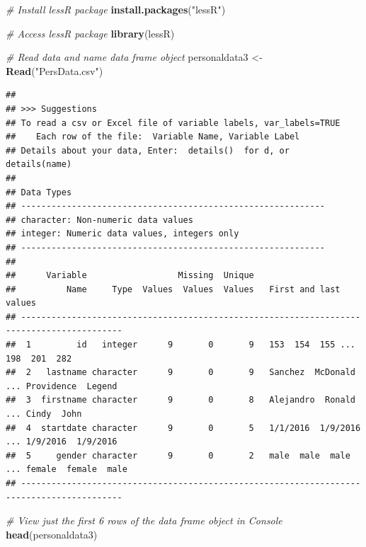 \documentclass[]{book}
\newenvironment{Shaded}{\begin{snugshade}}{\end{snugshade}}
\newcommand{\KeywordTok}[1]{\textcolor[rgb]{0.13,0.29,0.53}{\textbf{#1}}}
\newcommand{\StringTok}[1]{\textcolor[rgb]{0.31,0.60,0.02}{#1}}
\newcommand{\CommentTok}[1]{\textcolor[rgb]{0.56,0.35,0.01}{\textit{#1}}}
\newcommand{\NormalTok}[1]{#1}
\begin{document}
\begin{Shaded}
\begin{Highlighting}[]
\CommentTok{# Install lessR package}
\KeywordTok{install.packages}\NormalTok{(}\StringTok{"lessR"}\NormalTok{)}
\end{Highlighting}
\end{Shaded}

\begin{Shaded}
\begin{Highlighting}[]
\CommentTok{# Access lessR package}
\KeywordTok{library}\NormalTok{(lessR)}

\CommentTok{# Read data and name data frame object}
\NormalTok{personaldata3 <-}\StringTok{ }\KeywordTok{Read}\NormalTok{(}\StringTok{"PersData.csv"}\NormalTok{)}
\end{Highlighting}
\end{Shaded}

\begin{verbatim}
## 
## >>> Suggestions
## To read a csv or Excel file of variable labels, var_labels=TRUE
##    Each row of the file:  Variable Name, Variable Label
## Details about your data, Enter:  details()  for d, or  details(name)
## 
## Data Types
## ------------------------------------------------------------
## character: Non-numeric data values
## integer: Numeric data values, integers only
## ------------------------------------------------------------
## 
##      Variable                  Missing  Unique 
##          Name     Type  Values  Values  Values   First and last values
## ------------------------------------------------------------------------------------------
##  1         id   integer      9       0       9   153  154  155 ... 198  201  282
##  2   lastname character      9       0       9   Sanchez  McDonald ... Providence  Legend
##  3  firstname character      9       0       8   Alejandro  Ronald ... Cindy  John
##  4  startdate character      9       0       5   1/1/2016  1/9/2016 ... 1/9/2016  1/9/2016
##  5     gender character      9       0       2   male  male  male ... female  female  male
## ------------------------------------------------------------------------------------------
\end{verbatim}

\begin{Shaded}
\begin{Highlighting}[]
\CommentTok{# View just the first 6 rows of the data frame object in Console}
\KeywordTok{head}\NormalTok{(personaldata3)}
\end{Highlighting}
\end{Shaded}
\end{document}
